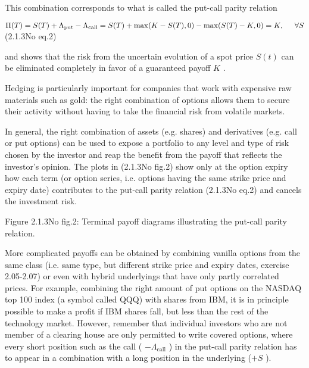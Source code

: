 \documentclass{beamer}
\begin{document}
	\begin{frame}
		This combination corresponds to what is called the put-call parity relation
		
		$\displaystyle \Pi(T) = S(T)+\Lambda_\mathrm{put}-\Lambda_\mathrm{call} = S(T) + \mathrm{max}(K-S(T),0) -\mathrm{max}(S(T)-K,0) = K, \hspace{5mm}\forall S$	 (2.1.3No eq.2)
		
		and shows that the risk from the uncertain evolution of a spot price  $ S(t)$ can be eliminated completely in favor of a guaranteed payoff $ K$ . 
		
	\end{frame}
	\begin{frame}
		
		Hedging is particularly important for companies that work with expensive raw materials such as gold: the right combination of options allows them to secure their activity without having to take the financial risk from volatile markets.
	\end{frame}
	\begin{frame}
		In general, the right combination of assets (e.g. shares) and derivatives (e.g. call or put options) can be used to expose a portfolio to any level and type of risk chosen by the investor and reap the benefit from the payoff that reflects the investor's opinion. The plots in (2.1.3No fig.2) show only at the option expiry how each term (or option series, i.e. options having the same strike price and expiry date) contributes to the put-call parity relation (2.1.3No eq.2) and cancels the investment risk.
		
		Figure 2.1.3No fig.2: Terminal payoff diagrams illustrating the put-call parity relation.
	\end{frame}
	\begin{frame}
		
		More complicated payoffs can be obtained by combining vanilla options from the same class (i.e. same type, but different strike price and expiry dates, exercise 2.05-2.07) or even with hybrid underlyings that have only partly correlated prices. For example, combining the right amount of put options on the NASDAQ top 100 index (a symbol called QQQ) with shares from IBM, it is in principle possible to make a profit if IBM shares fall, but less than the rest of the technology market. However, remember that individual investors who are not member of a clearing house are only permitted to write covered options, where every short position such as the call ( $ -\Lambda_\mathrm{call}$ ) in the put-call parity relation has to appear in a combination with a long position in the underlying ($ +S$ ).
	\end{frame}
\end{document}
